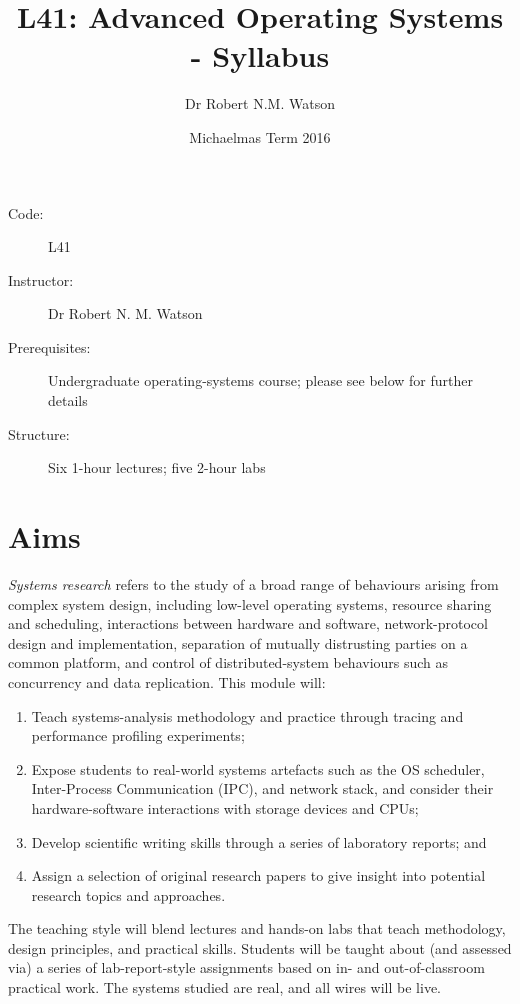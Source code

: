 \documentclass[a4paper,10pt]{article}
\begin{document}
\title{L41: Advanced Operating Systems - Syllabus}
\author{Dr Robert N.M. Watson}
\date{Michaelmas Term 2016}
\maketitle

\noindent
\begin{description}
\item[Code:] L41
\item[Instructor:] Dr Robert N. M. Watson
\item[Prerequisites:] Undergraduate operating-systems course; please see below
  for further details
\item[Structure:] Six 1-hour lectures; five 2-hour labs
\end{description}

\section{Aims}

\textit{Systems research} refers to the study of a broad range of behaviours
arising from complex system design, including low-level operating systems,
resource sharing and scheduling, interactions between hardware and software,
network-protocol design and implementation, separation of mutually distrusting
parties on a common platform, and control of distributed-system behaviours
such as concurrency and data replication.
This module will:

\begin{enumerate}
\item Teach systems-analysis methodology and practice through tracing and
  performance profiling experiments;
\item Expose students to real-world systems artefacts such as the
  OS scheduler, Inter-Process Communication (IPC), and network stack, and
  consider their hardware-software interactions with storage devices and CPUs;
\item Develop scientific writing skills through a series of laboratory
  reports; and
\item Assign a selection of original research papers to give insight into
  potential research topics and approaches.
\end{enumerate}

The teaching style will blend lectures and hands-on labs that teach
methodology, design principles, and practical skills.
Students will be taught about (and assessed via) a series of lab-report-style
assignments based on in- and out-of-classroom practical work.
The systems studied are real, and all wires will be live.
\end{document}
